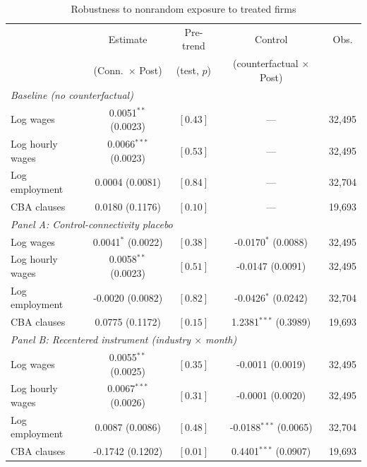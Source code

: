 \begin{table}[H]\centering\scriptsize
\caption{Robustness to nonrandom exposure to treated firms}
\label{tab:nonrandom_exposure}
\begin{tabular}{l c c c c}
\toprule
 & Estimate & Pre-trend & Control & Obs. \\
 & (Conn.\ $\times$ Post) & (test, $p$) & (counterfactual $\times$ Post) & \\
\midrule
\multicolumn{5}{l}{\textit{Baseline (no counterfactual)}} \\
Log wages & 0.0051$^{**}$ (0.0023) & $[0.43]$ & --- & 32{,}495 \\
Log hourly wages & 0.0066$^{***}$ (0.0023) & $[0.53]$ & --- & 32{,}495 \\
Log employment & 0.0004 (0.0081) & $[0.84]$ & --- & 32{,}704 \\
CBA clauses & 0.0180 (0.1176) & $[0.10]$ & --- & 19{,}693 \\
\midrule
\multicolumn{5}{l}{\textit{Panel A: Control-connectivity placebo}} \\
Log wages & 0.0041$^{*}$ (0.0022) & $[0.38]$ & -0.0170$^{*}$ (0.0088) & 32{,}495 \\
Log hourly wages & 0.0058$^{**}$ (0.0023) & $[0.51]$ & -0.0147 (0.0091) & 32{,}495 \\
Log employment & -0.0020 (0.0082) & $[0.82]$ & -0.0426$^{*}$ (0.0242) & 32{,}704 \\
CBA clauses & 0.0775 (0.1172) & $[0.15]$ & 1.2381$^{***}$ (0.3989) & 19{,}693 \\
\midrule
\multicolumn{5}{l}{\textit{Panel B: Recentered instrument (industry $\times$ month)}} \\
Log wages & 0.0055$^{**}$ (0.0025) & $[0.35]$ & -0.0011 (0.0019) & 32{,}495 \\
Log hourly wages & 0.0067$^{***}$ (0.0026) & $[0.31]$ & -0.0001 (0.0020) & 32{,}495 \\
Log employment & 0.0087 (0.0086) & $[0.48]$ & -0.0188$^{***}$ (0.0065) & 32{,}704 \\
CBA clauses & -0.1742 (0.1202) & $[0.01]$ & 0.4401$^{***}$ (0.0907) & 19{,}693 \\
\bottomrule
\end{tabular}

\end{table}
